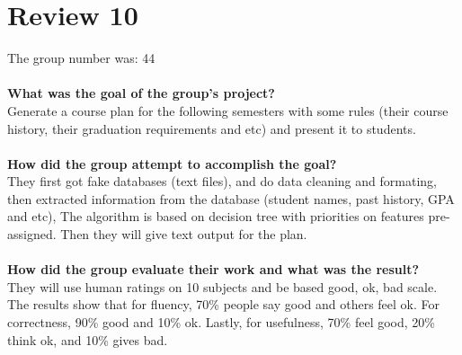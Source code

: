 \documentclass[paper=a4, fontsize=11pt]{scrartcl} %
\numberwithin{equation}{section} %
\numberwithin{figure}{section} %
\numberwithin{table}{section} %
\begin{document}
\section{Review 10}
{The group number was: 44} \\
\ \\
{\bf What was the goal of the group's project?} \\
Generate a course plan for the following semesters with some rules (their course history, their graduation requirements and etc) and
present it to students.\\
\ \\
{\bf How did the group attempt to accomplish the goal?}\\
They first got fake databases (text files), and do data cleaning and formating, then extracted information from the database (student names, past history, GPA and etc),
The algorithm is based on decision tree with priorities on features pre-assigned. Then they will give text output for the plan.\\
\ \\
{\bf How did the group evaluate their work and what was the result?}\\
They will use human ratings on 10 subjects and be based good, ok, bad scale. The results show that for fluency, 70\% people say good and others feel ok. 
For correctness, 90\% good and 10\% ok. Lastly, for usefulness, 70\% feel good, 20\% think ok, and 10\% gives bad.
\end{document}
